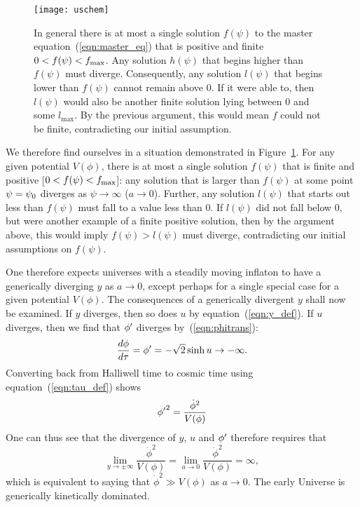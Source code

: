 %
\begin{figure}
  \texttt{[image: uschem]}
  \caption{In general there is at most a single solution $f(\psi)$ to the master equation~\protect(\ref{eqn:master_eq}) that is positive and finite $0<f(\psi)<f_\mathrm{max}$. Any solution $h(\psi)$ that begins higher than $f(\psi)$ must diverge. Consequently, any solution $l(\psi)$ that begins lower than $f(\psi)$ cannot remain above $0$. If it were able to, then $l(\psi)$ would also be another finite solution lying between $0$ and some $l_\mathrm{max}$. By the previous argument, this would mean $f$ could not be finite, contradicting our initial assumption.  }
  \label{fig:figure_uschem}
\end{figure}
%
We therefore find ourselves in a situation demonstrated in Figure~\ref{fig:figure_uschem}. For any given potential $V(\phi)$, there is at most a single solution $f(\psi)$ that is finite and positive [$0<f(\psi)<f_\mathrm{max}$]: any solution that is larger than $f(\psi)$ at some point $\psi=\psi_0$ diverges as $\psi\to\infty$ ($a\to0$). Further, any solution $l(\psi)$ that starts out less than $f(\psi)$ must fall to a value less than $0$.  If $l(\psi)$ did not fall below $0$, but were another example of a finite positive solution, then by the argument above, this would imply $f(\psi)>l(\psi)$ must diverge, contradicting our initial assumptions on $f(\psi)$.

One therefore expects universes with a steadily moving inflaton to have a generically diverging $y$ as $a\to0$, except perhaps for a single special case for a given potential $V(\phi)$.  The consequences of a generically divergent $y$ shall now be examined.  If $y$ diverges, then so does $u$ by equation~(\ref{eqn:y_def}). If $u$ diverges, then we find that ${{\phi}^\prime}$ diverges by~(\ref{eqn:phitrans}):
%
\begin{equation}
  \frac{d\phi}{d\tau}={{\phi}^\prime} 
  = 
  -\sqrt{2}\sinh u\rightarrow -\infty.
\end{equation}
%
Converting back from Halliwell time to cosmic time using equation~(\ref{eqn:tau_def}) shows
%
\begin{equation}
  {{\phi}^\prime}^2 
  = 
  \frac{\dot{\phi}^2}{V(\phi)}
\end{equation}
%
One can thus see that the divergence of $y$, $u$ and ${{\phi}^\prime}$ therefore requires that
%
\begin{equation}
  \lim\limits_{y\to\pm\infty} \frac{\dot\phi^2}{V(\phi)}
  =
  \lim\limits_{a\to 0} \frac{\dot\phi^2}{V(\phi)} = \infty,
  \label{eqn:kdfinal}
\end{equation}
%
which is equivalent to saying that $\dot{\phi}^2\gg V(\phi)$ as
$a\to0$. The early Universe is generically kinetically dominated.

